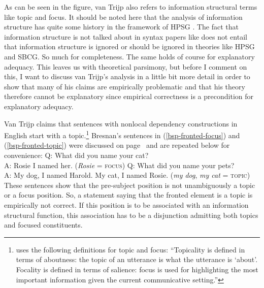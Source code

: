 As can be seen in the figure, van Trijp also refers to information structural terms
like topic and focus. It should be noted here that the analysis of information structure has quite
some history in the framework of HPSG  \citep{EV96a, 
Kuhn95b,Kuhn96a, 
GuntherMaienborn1999,
Wilcock2001a,Wilcock2005a, 
deKuthy2002a,Paggio2005a-u, 
Bildhauer2008a,BC2010a}. The fact that information structure is not talked about in syntax
papers like  does not entail that information structure is ignored or should be
ignored in theories like HPSG and SBCG. So much for completeness. The same holds of course for
explanatory adequacy. This leaves us with theoretical parsimony, but before I comment on this, I
want to discuss van Trijp's analysis in a little bit more detail in order to show that many of his claims
are empirically problematic and that his theory therefore cannot be explanatory since empirical
correctness is a precondition for explanatory adequacy.

Van Trijp claims that sentences with nonlocal dependency constructions in English start with a
topic.\footnote{%
 uses the following definitions for topic and focus: ``Topicality is defined in terms of aboutness: the topic of an utterance
is what the utterance is `about'. Focality is defined in terms of salience:
focus is used for highlighting the most important information given the
current communicative setting.''
} Bresnan's sentences in (\ref{bsp-fronted-focus}) and (\ref{bsp-fronted-topic}) were discussed on page~\pageref{bsp-fronted-focus}
\citep[]{Bresnan2001a} and are repeated below for convenience:
\ea
\label{bsp-fronted-focus-two}
Q: What did you name your cat?\\
A: Rosie I named her. (\emph{Rosie} = \textsc{focus})
\z
\ea
\label{bsp-fronted-topic-two}
Q: What did you name your pets?\\
A: My dog, I named Harold. My cat, I named Rosie. (\emph{my dog}, \emph{my cat} = \textsc{topic})
\z
These sentences show that the pre-subject position is not unambiguously a topic or a focus
position. So, a statement saying that the fronted element is a topic is empirically not correct. If this position is to be associated with an information structural function, this
association has to be a disjunction admitting both topics and focused constituents.

